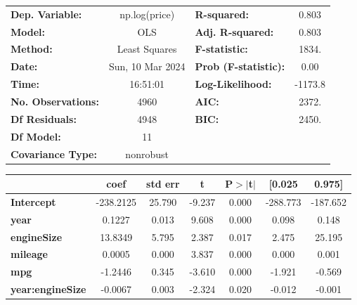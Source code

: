 \documentclass[
  letterpaper,
  DIV=11,
  numbers=noendperiod]{scrreprt}
\begin{document}
\begin{center}
\begin{tabular}{lclc}
\toprule
\textbf{Dep. Variable:}     &  np.log(price)   & \textbf{  R-squared:         } &     0.803   \\
\textbf{Model:}             &       OLS        & \textbf{  Adj. R-squared:    } &     0.803   \\
\textbf{Method:}            &  Least Squares   & \textbf{  F-statistic:       } &     1834.   \\
\textbf{Date:}              & Sun, 10 Mar 2024 & \textbf{  Prob (F-statistic):} &     0.00    \\
\textbf{Time:}              &     16:51:01     & \textbf{  Log-Likelihood:    } &   -1173.8   \\
\textbf{No. Observations:}  &        4960      & \textbf{  AIC:               } &     2372.   \\
\textbf{Df Residuals:}      &        4948      & \textbf{  BIC:               } &     2450.   \\
\textbf{Df Model:}          &          11      & \textbf{                     } &             \\
\textbf{Covariance Type:}   &    nonrobust     & \textbf{                     } &             \\
\bottomrule
\end{tabular}
\begin{tabular}{lcccccc}
                            & \textbf{coef} & \textbf{std err} & \textbf{t} & \textbf{P$> |$t$|$} & \textbf{[0.025} & \textbf{0.975]}  \\
\midrule
\textbf{Intercept}          &    -238.2125  &       25.790     &    -9.237  &         0.000        &     -288.773    &     -187.652     \\
\textbf{year}               &       0.1227  &        0.013     &     9.608  &         0.000        &        0.098    &        0.148     \\
\textbf{engineSize}         &      13.8349  &        5.795     &     2.387  &         0.017        &        2.475    &       25.195     \\
\textbf{mileage}            &       0.0005  &        0.000     &     3.837  &         0.000        &        0.000    &        0.001     \\
\textbf{mpg}                &      -1.2446  &        0.345     &    -3.610  &         0.000        &       -1.921    &       -0.569     \\
\textbf{year:engineSize}    &      -0.0067  &        0.003     &    -2.324  &         0.020        &       -0.012    &       -0.001     \\

\end{tabular}
\end{center}
\end{document}
